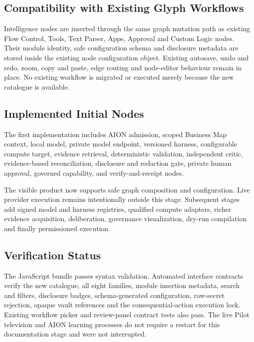 \subsection{Compatibility with Existing Glyph Workflows}

Intelligence nodes are inserted through the same graph mutation path as existing Flow Control,
Tools, Text Parser, Apps, Approval and Custom Logic nodes.  Their module identity, safe
configuration schema and disclosure metadata are stored inside the existing node configuration
object.  Existing autosave, undo and redo, zoom, copy and paste, edge routing and node-editor
behaviour remain in place.  No existing workflow is migrated or executed merely because the new
catalogue is available.

\subsection{Implemented Initial Nodes}

The first implementation includes AION admission, scoped Business Map context, local model,
private model endpoint, versioned harness, configurable compute target, evidence retrieval,
deterministic validation, independent critic, evidence-based reconciliation, disclosure and
redaction gate, private human approval, governed capability, and verify-and-receipt nodes.

The visible product now supports safe graph composition and configuration.  Live provider
execution remains intentionally outside this stage.  Subsequent stages add signed model and
harness registries, qualified compute adapters, richer evidence acquisition, deliberation,
governance visualization, dry-run compilation and finally permissioned execution.

\subsection{Verification Status}

The JavaScript bundle passes syntax validation.  Automated interface contracts verify the new
catalogue, all eight families, module insertion metadata, search and filters, disclosure badges,
schema-generated configuration, raw-secret rejection, opaque vault references and the
consequential-action execution lock.  Existing workflow picker and review-panel contract tests
also pass.  The live Pilot television and AION learning processes do not require a restart for
this documentation stage and were not interrupted.
